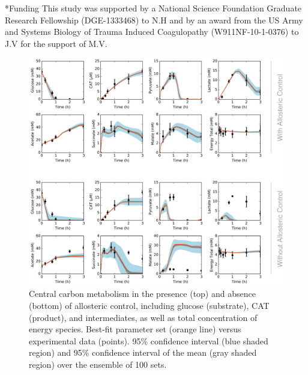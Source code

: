 \documentclass[12pt]{article}
\makeatletter
\renewcommand\section{\@startsection
	{subsection}{2}{0mm}
	{-0.2in}
	{0.05\baselineskip}
	{\normalfont\large\bfseries}}
\makeatother
\begin{document}
\section*{Funding}
This study was supported by a National Science Foundation Graduate Research Fellowship (DGE-1333468) to N.H and by an award from the US Army and Systems Biology of Trauma Induced Coagulopathy (W911NF-10-1-0376) to J.V for the support of M.V.

\clearpage



\clearpage


\begin{figure}[ht]
\centering
\includegraphics[width=1.00\textwidth]{./Figures/CarbonBoth_png.pdf}
\caption{Central carbon metabolism in the presence (top) and absence (bottom) of allosteric control, including glucose (substrate), CAT (product), and intermediates, as well as total concentration of energy species. Best-fit parameter set (orange line) versus experimental data (points). 95\% confidence interval (blue shaded region) and 95\% confidence interval of the mean (gray shaded region) over the ensemble of 100 sets.}
\label{fig:CarbonBoth}
\end{figure}
\end{document}
